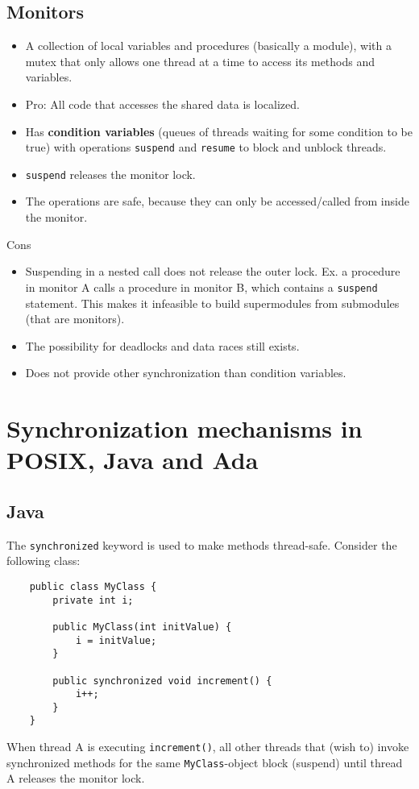 \subsection{Monitors}
\begin{itemize}
    \item A collection of local variables and procedures (basically a module), with a mutex that only allows one thread at a time to access its methods and variables.
    \item Pro: All code that accesses the shared data is localized.
    \item Has \textbf{condition variables} (queues of threads waiting for some condition to be true) with operations \texttt{suspend} and \texttt{resume} to block and unblock threads.
    \item \texttt{suspend} releases the monitor lock.
    \item The operations are safe, because they can only be accessed/called from inside the monitor.
\end{itemize}
Cons
\begin{itemize}
    \item Suspending in a nested call does not release the outer lock. Ex. a procedure in monitor A calls a procedure in monitor B, which contains a \texttt{suspend} statement. This makes it infeasible to build supermodules from submodules (that are monitors). 
    \item The possibility for deadlocks and data races still exists.
    \item Does not provide other synchronization than condition variables.
\end{itemize}

\section{Synchronization mechanisms in POSIX, Java and Ada}
\subsection{Java}
The \texttt{synchronized} keyword is used to make methods thread-safe. Consider the following class:
\begin{verbatim}
    public class MyClass {
        private int i;

        public MyClass(int initValue) {
            i = initValue;
        }

        public synchronized void increment() {
            i++;
        }
    }
\end{verbatim}
When thread A is executing \texttt{increment()}, all other threads that (wish to) invoke synchronized methods for the same \texttt{MyClass}-object block (suspend) until thread A releases the monitor lock.

